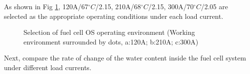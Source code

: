 As shown in Fig \ref{fig:figure9}, 120A/67$^{\circ}C$/2.15, 210A/68$^{\circ}C$/2.15, 300A/70$^{\circ}C$/2.05 are selected as the appropriate operating conditions under each load current.
\begin{figure}
	\label{fig:figure9}
	\caption{Selection of fuel cell OS operating environment (Working environment surrounded by dots, a:120A; b:210A; c:300A)}
\end{figure}
Next, compare the rate of change of the water content inside the fuel cell system under different load currents.

